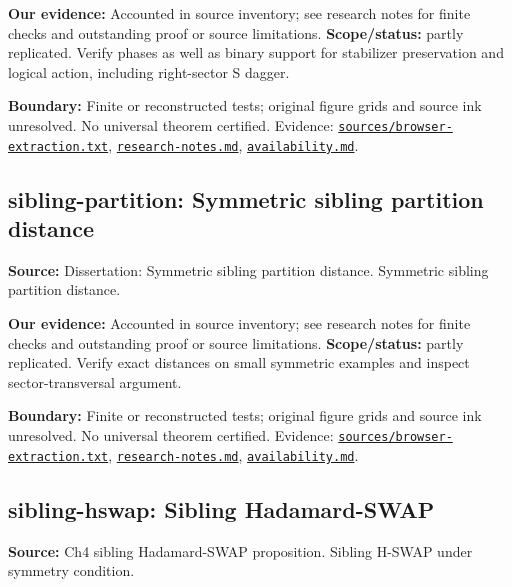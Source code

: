 \documentclass[11pt]{article}
\begin{document}
\textbf{Our evidence:} Accounted in source inventory; see research notes for finite checks and outstanding proof or source limitations. \textbf{Scope/status:} partly replicated. Verify phases as well as binary support for stabilizer preservation and logical action, including right-sector S dagger.

\textbf{Boundary:} Finite or reconstructed tests; original figure grids and source ink unresolved. No universal theorem certified. Evidence: \href{https://github.com/alectionary/vibe-math/blob/master/formalization/quintavalle-hgp/sources/browser-extraction.txt}{\nolinkurl{sources/browser-extraction.txt}}, \href{https://github.com/alectionary/vibe-math/blob/master/formalization/quintavalle-hgp/research-notes.md}{\nolinkurl{research-notes.md}}, \href{https://github.com/alectionary/vibe-math/blob/master/formalization/quintavalle-hgp/availability.md}{\nolinkurl{availability.md}}.
\subsection{sibling-partition: Symmetric sibling partition distance}
\label{claim:sibling-partition}
\textbf{Source:} Dissertation: Symmetric sibling partition distance. Symmetric sibling partition distance.

\textbf{Our evidence:} Accounted in source inventory; see research notes for finite checks and outstanding proof or source limitations. \textbf{Scope/status:} partly replicated. Verify exact distances on small symmetric examples and inspect sector-transversal argument.

\textbf{Boundary:} Finite or reconstructed tests; original figure grids and source ink unresolved. No universal theorem certified. Evidence: \href{https://github.com/alectionary/vibe-math/blob/master/formalization/quintavalle-hgp/sources/browser-extraction.txt}{\nolinkurl{sources/browser-extraction.txt}}, \href{https://github.com/alectionary/vibe-math/blob/master/formalization/quintavalle-hgp/research-notes.md}{\nolinkurl{research-notes.md}}, \href{https://github.com/alectionary/vibe-math/blob/master/formalization/quintavalle-hgp/availability.md}{\nolinkurl{availability.md}}.
\subsection{sibling-hswap: Sibling Hadamard-SWAP}
\label{claim:sibling-hswap}
\textbf{Source:} Ch4 sibling Hadamard-SWAP proposition. Sibling H-SWAP under symmetry condition.
\end{document}
